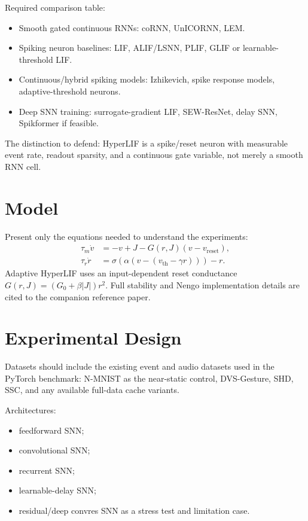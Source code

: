 \documentclass[journal]{IEEEtran}
\begin{document}
Required comparison table:
\begin{itemize}
  \item Smooth gated continuous RNNs: coRNN, UnICORNN, LEM.
  \item Spiking neuron baselines: LIF, ALIF/LSNN, PLIF, GLIF or learnable-threshold LIF.
  \item Continuous/hybrid spiking models: Izhikevich, spike response models, adaptive-threshold neurons.
  \item Deep SNN training: surrogate-gradient LIF, SEW-ResNet, delay SNN, Spikformer if feasible.
\end{itemize}

The distinction to defend: HyperLIF is a spike/reset neuron with measurable event rate, readout sparsity, and a continuous gate variable, not merely a smooth RNN cell.

\section{Model}
Present only the equations needed to understand the experiments:
\begin{align}
\tau_m \dot{v} &= -v + J - G(r, J)(v-v_{\mathrm{reset}}),\\
\tau_r \dot{r} &= \sigma(\alpha(v-(v_{\mathrm{th}}-\gamma r))) - r.
\end{align}
Adaptive HyperLIF uses an input-dependent reset conductance $G(r,J) = (G_0+\beta |J|)r^2$. Full stability and Nengo implementation details are cited to the companion reference paper.

\section{Experimental Design}
Datasets should include the existing event and audio datasets used in the PyTorch benchmark: N-MNIST as the near-static control, DVS-Gesture, SHD, SSC, and any available full-data cache variants.

Architectures:
\begin{itemize}
  \item feedforward SNN;
  \item convolutional SNN;
  \item recurrent SNN;
  \item learnable-delay SNN;
  \item residual/deep convres SNN as a stress test and limitation case.
\end{itemize}
\end{document}
